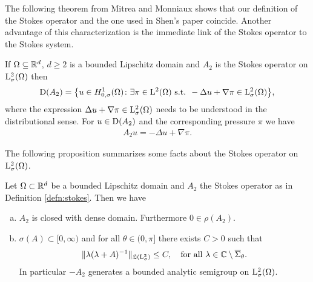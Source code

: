 The following theorem from Mitrea and Monniaux \cite[Thm 4.7]{mitreaMonniaux} shows that our definition of the Stokes operator and the one used in Shen's paper coincide. 
Another advantage of this characterization is the immediate link of the Stokes operator to the Stokes system.

\begin{thm}
  If $\Omega \subseteq \mathbb{R}^d$, $d \geq 2$ is a bounded Lipschitz domain and $A_2$ is the Stokes operator on $\mathrm{L}^2_\sigma(\Omega)$ then
  \begin{align*}
    \mathrm{D}(A_2) = \big\{ u \in H^1_{0,\sigma}(\Omega) \colon \exists \pi \in \mathrm{L}^2(\Omega) \text{ s.t. } -\Delta u + \nabla \pi \in \mathrm{L}^2_\sigma(\Omega) \big\},
  \end{align*}
  where the expression $\Delta u + \nabla \pi \in\mathrm{L}^2_\sigma(\Omega)$ needs to be understood in the distributional sense.
  For $u \in \mathrm{D}(A_2)$ and the corresponding pressure $\pi$ we have
  \begin{align*}
    A_2 u = -\Delta u + \nabla \pi.
  \end{align*}
\end{thm}

The following proposition summarizes some facts about the Stokes operator on $\mathrm{L}^2_\sigma(\Omega)$.

\begin{prop}
  Let $\Omega \subset \mathbb{R}^d$ be a bounded Lipschitz domain and $A_2$ the Stokes operator as in Definition \ref{defn:stokes}. Then we have
  \begin{enumerate}[a)]
    \item $A_2$ is closed with dense domain. Furthermore $0 \in \rho(A_2)$.
    \item $\sigma(A) \subset [0,\infty)$ and for all $\theta \in (0,\pi]$ there exists $C > 0$ such that
      \begin{align}
        \label{eq:resolventEstimateL2}
        \| \lambda(\lambda + A)^{-1} \|_{\mathfrak{L}(\mathrm{L}^2_\sigma)} \leq C, \quad\text{for all } \lambda \in \mathbb{C} \setminus \overline \Sigma_\theta.
      \end{align}
      In particular $-A_2$ generates a bounded analytic semigroup on $\mathrm{L}^2_\sigma(\Omega)$.
  \end{enumerate}
\end{prop}


